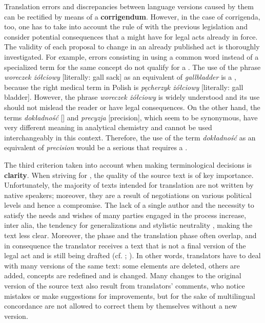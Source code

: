 \documentclass[output=paper]{langsci/langscibook}
\begin{document}
Translation errors and discrepancies between language versions caused by them can be rectified by means of a \textbf{corrigendum}. However, in the case of corrigenda, too, one has to take into account the rule of  with the previous legislation and consider potential consequences that a  might have for legal acts already in force. The validity of each proposal to change  in an already published act is thoroughly investigated. For example, errors consisting in using a common word instead of a specialized term for the same concept do not qualify for a . The use of the phrase \textit{woreczek żółciowy} [literally: gall sack] as an equivalent of \textit{gallbladder} is a , because the right medical term in Polish is \textit{pęcherzyk żółciowy} [literally: gall bladder]. However, the phrase \textit{woreczek żółciowy} is widely understood and its use should not mislead the reader or have legal consequences. On the other hand, the terms \textit{dokładność} [] and \textit{precyzja} [precision], which seem to be synonymous, have very different meaning in analytical chemistry and cannot be used interchangeably in this context. Therefore, the use of the term \textit{dokładność} as an equivalent of \textit{precision} would be a serious  that requires a .

The third criterion taken into account when making terminological decisions is \textbf{clarity}. When striving for , the quality of the source text is of key importance. Unfortunately, the majority of  texts intended for translation are not written by native speakers; moreover, they are a result of negotiations on various political levels and hence a compromise. The lack of a single author and the necessity to satisfy the needs and wishes of many parties engaged in the  process increase, inter alia, the tendency for generalizations and stylistic neutrality \citep{Koskinen2008}, making the text less clear. Moreover, the  phase and the translation phase often overlap, and in consequence the translator receives a text that is not a final version of the legal act and is still being drafted (cf. \citealt{Doczekalska2009production}; \citealt{Stefaniak2013}). In other words, translators have to deal with many versions of the same text: some elements are deleted, others are added, concepts are redefined and  is changed. Many changes to the original version of the source text also result from translators’ comments, who notice mistakes or make suggestions for improvements, but for the sake of multilingual concordance are not allowed to correct them by themselves without a new version.
\end{document}
